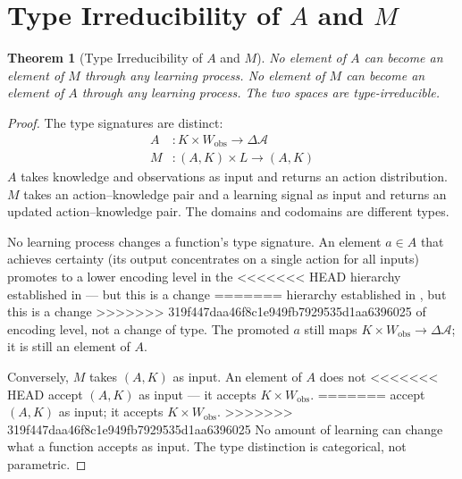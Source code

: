 \documentclass[11pt]{article}
\newtheorem{theorem}{Theorem}
\theoremstyle{definition}
\theoremstyle{remark}
\begin{document}
\section{Type Irreducibility of $A$ and $M$}
\label{sec:type}

\begin{theorem}[Type Irreducibility of $A$ and $M$]
\label{thm:type}
No element of $A$ can become an element of $M$ through any learning
process. No element of $M$ can become an element of $A$ through any
learning process. The two spaces are type-irreducible.
\end{theorem}

\begin{proof}
The type signatures are distinct:
\begin{align*}
A &: K \times W_{\mathrm{obs}} \to \Delta \mathcal{A} \\
M &: (A, K) \times L \to (A, K)
\end{align*}
$A$ takes knowledge and observations as input and returns an action
distribution. $M$ takes an action--knowledge pair and a learning
signal as input and returns an updated action--knowledge pair. The
domains and codomains are different types.

No learning process changes a function's type signature. An element
$a \in A$ that achieves certainty (its output concentrates on a single
action for all inputs) promotes to a lower encoding level in the
<<<<<<< HEAD
hierarchy established in \cite{McCarthy2026d} --- but this is a change
=======
hierarchy established in \cite{McCarthy2026d}, but this is a change
>>>>>>> 319f447daa46f8c1e949fb7929535d1aa6396025
of encoding level, not a change of type. The promoted $a$ still maps
$K \times W_{\mathrm{obs}} \to \Delta \mathcal{A}$; it is still an
element of $A$.

Conversely, $M$ takes $(A, K)$ as input. An element of $A$ does not
<<<<<<< HEAD
accept $(A, K)$ as input --- it accepts $K \times W_{\mathrm{obs}}$.
=======
accept $(A, K)$ as input; it accepts $K \times W_{\mathrm{obs}}$.
>>>>>>> 319f447daa46f8c1e949fb7929535d1aa6396025
No amount of learning can change what a function accepts as input. The
type distinction is categorical, not parametric.


\end{proof}
\end{document}
